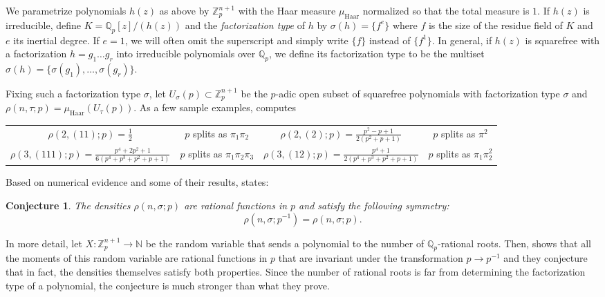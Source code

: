 \documentclass[10pt]{article}
\theoremstyle{plain}
\newtheorem{conjecture}[theorem]{Conjecture}
\theoremstyle{definition}
\numberwithin{equation}{section}
\begin{document}
We parametrize polynomials $h(z)$ as above by $\mathbb Z_p^{n+1}$ with the Haar measure $\mu_{\mathrm{Haar}}$ normalized so that the total measure is $1$. If $h(z)$ is irreducible, define $K = \mathbb Q_p[z]/(h(z))$ and the \emph{factorization type} of $h$ by $\sigma(h) = \{f^e\}$ where $f$ is the size of the residue field of $K$ and $e$ its inertial degree. If $e=1$, we will often omit the superscript and simply write $\{f\}$ instead of $\{f^1\}$. In general, if $h(z)$ is squarefree with a factorization $h = g_1\dots g_r$ into irreducible polynomials over $\mathbb Q_p$, we define its factorization type to be the multiset $\sigma(h) = \{\sigma(g_1),\dots,\sigma(g_r)\}$. 

Fixing such a factorization type $\sigma$, let $U_\sigma(p) \subset \mathbb Z_p^{n+1}$ be the $p$-adic open subset of squarefree polynomials with factorization type $\sigma$ and $\rho(n,\tau;p) = \mu_{\mathrm{Haar}}(U_\tau(p))$. As a few sample examples, \cite{bhargava2022density} computes
\begin{center}
\begin{tabular}{ |c|c||c|c| } 
\hline
 $\rho(2,(11);p) = \frac{1}{2}$ & $p$ splits as $\pi_1\pi_2$ &$\rho(2,(2);p) = \frac{p^2-p+1}{2(p^2+p+1)}$& $p$ splits as $\pi^2$\\
 $\rho(3,(111);p) = \frac{p^4+2p^2+1}{6(p^4+p^3+p^2+p+1)}$ & $p$ splits as $\pi_1\pi_2\pi_3$ & $\rho(3,(12);p) = \frac{p^4+1}{2(p^4+p^3+p^2+p+1)}$& $p$ splits as $\pi_1\pi_2^2$\\
 \hline
\end{tabular}
\end{center}
Based on numerical evidence and some of their results, \cite[Conjecture 1.2]{bhargava2022density} states:
\begin{conjecture}\label{conj: intro bhargava}
The densities $\rho(n,\sigma;p)$ are rational functions in $p$ and satisfy the following symmetry:
\[\rho(n,\sigma;p^{-1}) = \rho(n,\sigma;p).\]
\end{conjecture}

In more detail, let $X: \mathbb Z_p^{n+1} \to \mathbb N$ be the random variable that sends a polynomial to the number of $\mathbb Q_p$-rational roots. Then, \cite[Theorem 1]{bhargava2022density} shows that all the moments of this random variable are rational functions in $p$ that are invariant under the transformation $p \to p^{-1}$ and they conjecture that in fact, the densities themselves satisfy both properties. Since the number of rational roots is far from determining the factorization type of a polynomial, the conjecture is much stronger than what they prove.
\end{document}
